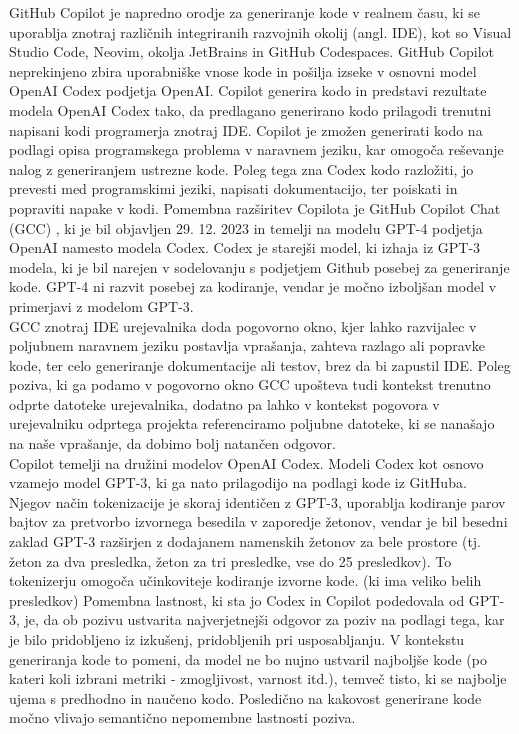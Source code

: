 \documentclass[a4paper,12pt,openright]{book}
\begin{document}
GitHub Copilot je napredno orodje za generiranje kode v realnem času, ki se uporablja znotraj različnih integriranih razvojnih okolij (angl. IDE), kot so Visual Studio Code, Neovim, okolja JetBrains in GitHub Codespaces. GitHub Copilot neprekinjeno zbira uporabniške vnose kode in pošilja izseke v osnovni model OpenAI Codex podjetja OpenAI. Copilot generira kodo in predstavi rezultate modela OpenAI Codex tako, da predlagano generirano kodo prilagodi trenutni napisani kodi programerja znotraj IDE. Copilot je zmožen generirati kodo na podlagi opisa programskega problema v naravnem jeziku, kar omogoča reševanje nalog z generiranjem ustrezne kode. Poleg tega zna Codex kodo razložiti, jo prevesti med programskimi jeziki, napisati dokumentacijo, ter poiskati in popraviti napake v kodi.
Pomembna razširitev Copilota je GitHub Copilot Chat (GCC) , ki je bil objavljen 29. 12. 2023 in temelji na modelu GPT-4 podjetja OpenAI namesto modela Codex. Codex je starejši model, ki izhaja iz GPT-3 modela, ki je bil narejen v sodelovanju s podjetjem Github posebej za generiranje kode. GPT-4 ni razvit posebej za kodiranje, vendar je močno izboljšan model v primerjavi z modelom GPT-3.
\cite{Sundqvist1866649} \\
GCC znotraj IDE urejevalnika doda pogovorno okno, kjer lahko razvijalec v poljubnem naravnem jeziku postavlja vprašanja, zahteva razlago ali popravke kode, ter celo generiranje dokumentacije ali testov, brez da bi zapustil IDE. Poleg poziva, ki ga podamo v pogovorno okno GCC upošteva tudi kontekst trenutno odprte datoteke urejevalnika, dodatno pa lahko v kontekst pogovora v urejevalniku odprtega projekta referenciramo poljubne datoteke, ki se nanašajo na naše vprašanje, da dobimo bolj natančen odgovor.\cite{github_copilot_chat} \\
Copilot temelji na družini modelov OpenAI Codex. Modeli Codex kot osnovo vzamejo model GPT-3, ki ga nato prilagodijo na podlagi kode iz GitHuba. Njegov način tokenizacije je skoraj identičen z GPT-3, uporablja kodiranje parov bajtov za pretvorbo izvornega besedila v zaporedje žetonov, vendar je bil besedni zaklad GPT-3 razširjen z dodajanem namenskih žetonov za bele prostore (tj. žeton za dva presledka, žeton za tri presledke, vse do 25 presledkov). To tokenizerju omogoča učinkoviteje kodiranje izvorne kode. (ki ima veliko belih presledkov) Pomembna lastnost, ki sta jo Codex in Copilot podedovala od GPT-3, je, da ob pozivu ustvarita najverjetnejši odgovor za poziv na podlagi tega, kar je bilo pridobljeno iz izkušenj, pridobljenih pri usposabljanju. V kontekstu generiranja kode to pomeni, da model ne bo nujno ustvaril najboljše kode (po kateri koli izbrani metriki - zmogljivost, varnost itd.), temveč tisto, ki se najbolje ujema s predhodno in naučeno kodo. Posledično na kakovost generirane kode močno vlivajo semantično nepomembne lastnosti poziva. \cite{9833571, 10.1145/3520312.3534862}
\end{document}
